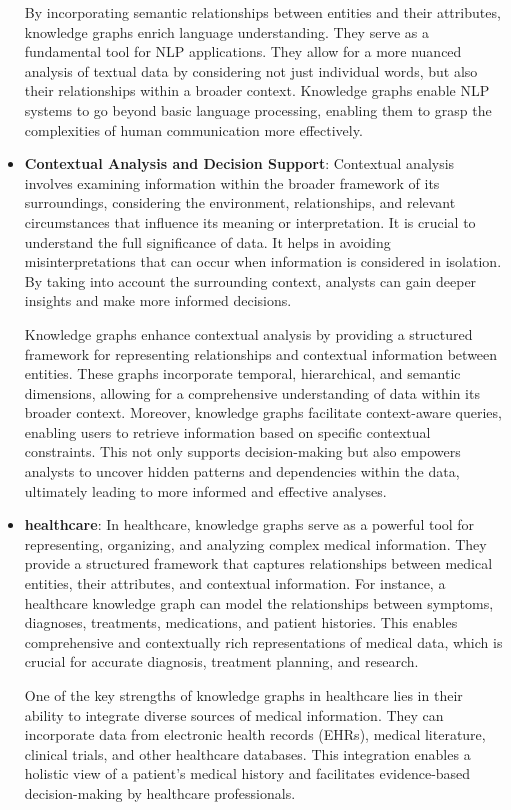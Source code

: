 \begin{itemize}
    By incorporating semantic relationships between entities and their attributes, knowledge graphs enrich language understanding. They serve as a fundamental tool for NLP applications. They allow for a more nuanced analysis of textual data by considering not just individual words, but also their relationships within a broader context. Knowledge graphs enable NLP systems to go beyond basic language processing, enabling them to grasp the complexities of human communication more effectively.
   

    \item \textbf{Contextual Analysis and Decision Support}:
    Contextual analysis involves examining information within the broader framework of its surroundings, considering the environment, relationships, and relevant circumstances that influence its meaning or interpretation. It is crucial to understand the full significance of data. It helps in avoiding misinterpretations that can occur when information is considered in isolation. By taking into account the surrounding context, analysts can gain deeper insights and make more informed decisions. 
    
    Knowledge graphs enhance contextual analysis by providing a structured framework for representing relationships and contextual information between entities. These graphs incorporate temporal, hierarchical, and semantic dimensions, allowing for a comprehensive understanding of data within its broader context. Moreover, knowledge graphs facilitate context-aware queries, enabling users to retrieve information based on specific contextual constraints. This not only supports decision-making but also empowers analysts to uncover hidden patterns and dependencies within the data, ultimately leading to more informed and effective analyses.

    \item \textbf{healthcare}:
    In healthcare, knowledge graphs serve as a powerful tool for representing, organizing, and analyzing complex medical information. They provide a structured framework that captures relationships between medical entities, their attributes, and contextual information. For instance, a healthcare knowledge graph can model the relationships between symptoms, diagnoses, treatments, medications, and patient histories. This enables comprehensive and contextually rich representations of medical data, which is crucial for accurate diagnosis, treatment planning, and research.

    One of the key strengths of knowledge graphs in healthcare lies in their ability to integrate diverse sources of medical information. They can incorporate data from electronic health records (EHRs), medical literature, clinical trials, and other healthcare databases. This integration enables a holistic view of a patient's medical history and facilitates evidence-based decision-making by healthcare professionals.
    

\end{itemize}
